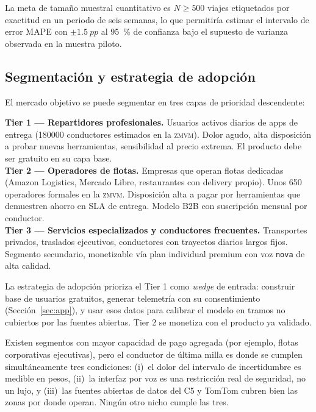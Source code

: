 \documentclass[11pt,a4paper]{article}
\newcommand{\ZMVM}{\textsc{zmvm}}
\begin{document}
La meta de tamaño muestral cuantitativo es $N \geq \num{500}$
viajes etiquetados por exactitud en un periodo de seis semanas,
lo que permitiría estimar el intervalo de error MAPE con
$\pm\SI{1.5}{pp}$ al \SI{95}{\percent} de confianza bajo el
supuesto de varianza observada en la muestra piloto.

\subsection{Segmentación y estrategia de adopción}

El mercado objetivo se puede segmentar en tres capas de prioridad
descendente:

\begin{keybox}
\textbf{\textcolor{vialAmber}{Tier 1 --- Repartidores profesionales.}}
Usuarios activos diarios de apps de entrega (\num{180000}
conductores estimados en la \ZMVM). Dolor agudo, alta disposición
a probar nuevas herramientas, sensibilidad al precio extrema. El
producto debe ser gratuito en su capa base.\\[0.3em]
\textbf{\textcolor{vialTeal}{Tier 2 --- Operadores de flotas.}}
Empresas que operan flotas dedicadas (Amazon Logistics, Mercado
Libre, restaurantes con delivery propio). Unos \num{650}
operadores formales en la \ZMVM. Disposición alta a pagar por
herramientas que demuestren ahorro en SLA de entrega. Modelo B2B
con suscripción mensual por conductor.\\[0.3em]
\textbf{\textcolor{vialAqua}{Tier 3 --- Servicios especializados
y conductores frecuentes.}} Transportes privados, traslados
ejecutivos, conductores con trayectos diarios largos fijos.
Segmento secundario, monetizable vía plan individual premium con
voz \texttt{nova} de alta calidad.
\end{keybox}

La estrategia de adopción prioriza el Tier 1 como \emph{wedge}
de entrada: construir base de usuarios gratuitos, generar
telemetría con su consentimiento (Sección~\ref{sec:app}), y usar
esos datos para calibrar el modelo en tramos no cubiertos por
las fuentes abiertas. Tier 2 se monetiza con el producto ya
validado.

\begin{tipbox}
Existen segmentos con mayor capacidad de pago agregada (por
ejemplo, flotas corporativas ejecutivas), pero el conductor de
última milla es donde se cumplen simultáneamente tres
condiciones: (i)~el dolor del intervalo de incertidumbre es
medible en pesos, (ii)~la interfaz por voz es una restricción
real de seguridad, no un lujo, y (iii)~las fuentes abiertas de
datos del C5 y TomTom cubren bien las zonas por donde operan.
Ningún otro nicho cumple las tres.
\end{tipbox}
\end{document}

